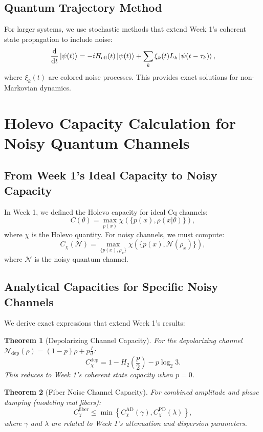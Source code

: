 \documentclass[12pt,a4paper]{article}
\newtheorem{theorem}{Theorem}[section]
\begin{document}
\subsection{Quantum Trajectory Method}
For larger systems, we use stochastic methods that extend Week 1's coherent state propagation to include noise:
\begin{equation}
    \dv{}{t} \ket{\psi(t)} = -i H_{\text{eff}}(t) \ket{\psi(t)} + \sum_k \xi_k(t) L_k \ket{\psi(t - \tau_k)},
\end{equation}
where $\xi_k(t)$ are colored noise processes. This provides exact solutions for non-Markovian dynamics.

\section{Holevo Capacity Calculation for Noisy Quantum Channels}
\label{sec:holevo_capacity}

\subsection{From Week 1's Ideal Capacity to Noisy Capacity}
In Week 1, we defined the Holevo capacity for ideal Cq channels:
\[
C(\theta) = \max_{p(x)} \chi(\{p(x), \rho(x|\theta)\}),
\]
where $\chi$ is the Holevo quantity. For noisy channels, we must compute:
\[
C_\chi(\mathcal{N}) = \max_{\{p(x), \rho_x\}} \chi(\{p(x), \mathcal{N}(\rho_x)\}),
\]
where $\mathcal{N}$ is the noisy quantum channel.

\subsection{Analytical Capacities for Specific Noisy Channels}
We derive exact expressions that extend Week 1's results:

\begin{theorem}[Depolarizing Channel Capacity]
    For the depolarizing channel $\mathcal{N}_{\text{dep}}(\rho) = (1-p)\rho + p \frac{I}{d}$:
    \[
    C_\chi^{\text{dep}} = 1 - H_2\left( \frac{p}{2} \right) - p \log_2 3.
    \]
    This reduces to Week 1's coherent state capacity when $p=0$.
\end{theorem}

\begin{theorem}[Fiber Noise Channel Capacity]
    For combined amplitude and phase damping (modeling real fibers):
    \[
    C_\chi^{\text{fiber}} \leq \min \left\{ C_\chi^{\text{AD}}(\gamma), C_\chi^{\text{PD}}(\lambda) \right\},
    \]
    where $\gamma$ and $\lambda$ are related to Week 1's attenuation and dispersion parameters.
\end{theorem}
\end{document}
